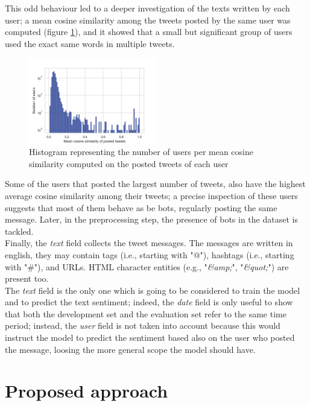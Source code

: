 \documentclass[conference]{IEEEtran}
\begin{document}
This odd behaviour led to a deeper investigation of the texts written by each user; a mean cosine similarity among the tweets posted by the same user was computed (figure \ref{fig:internal_similarity_users}), and it showed that a small but significant group of users used the exact same words in multiple tweets.  
\begin{figure}
    \includegraphics[width=0.5\textwidth]{internal_similarity_users}
    \caption[Mean cosine similarity]{Histogram representing the number of users per mean cosine similarity computed on the posted tweets of each user}
    \label{fig:internal_similarity_users}
\end{figure}
Some of the users that posted the largest number of tweets, also have the highest average cosine similarity among their tweets; a precise inspection of these users suggests that most of them behave as be bots, regularly posting the same message. Later, in the preprocessing step, the presence of bots in the dataset is tackled. \\
Finally, the \textit{text} field collects the tweet messages. The messages are written in english, they may contain tags (i.e., starting with "@"), hashtags (i.e., starting with "\#"), and URLs. HTML character entities (e.g., "\textit{\&amp;}", "\textit{\&quot;}") are present too. \\
The \textit{text} field is the only one which is going to be considered to train the model and to predict the text sentiment; indeed, the \textit{date} field is only useful to show that both the development set and the evaluation set refer to the same time period; instead, the \textit{user} field is not taken into account because this would instruct the model to predict the sentiment based also on the user who posted the message, loosing the more general scope the model should have. 

\section{Proposed approach}
\end{document}
